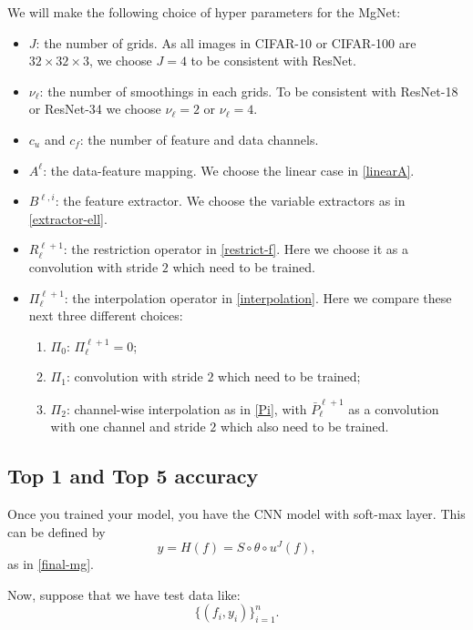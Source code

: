 We will make the following choice of hyper parameters
for the MgNet:
\begin{itemize}
	\item $J$: the number of grids. As all images in CIFAR-10 or CIFAR-100
	are $32\times 32 \times 3$,  we choose $J = 4$ to be consistent with ResNet.
	\item $\nu_\ell$:  the number of smoothings in each grids. To be consistent with
	ResNet-18 or ResNet-34 we choose $\nu_\ell = 2$ or $\nu_\ell = 4$.
	\item $c_u$ and $c_f$: the number of feature and data channels. 
	\item $A^\ell$: the data-feature mapping. We choose the linear case in \eqref{linearA}.
	\item $B^{\ell,i}$: the feature extractor. We choose the variable extractors as in \eqref{extractor-ell}.
	\item $R_{\ell}^{\ell+1}$: the restriction operator in \eqref{restrict-f}. 
	Here we choose it as a convolution with stride $2$ which need to be trained.
	\item $\Pi_\ell^{\ell+1}$: the interpolation operator in
	\eqref{interpolation}.  Here we compare these next three
	different choices: 
	\begin{enumerate}
		\item {$\Pi_0$: } $\Pi_\ell^{\ell+1} = 0$;
		\item {$\Pi_1$: }convolution with stride $2$ which need to be
		trained; 
		\item {$\Pi_2$: }channel-wise interpolation as in
		\eqref{Pi}, with $\bar P_{\ell}^{\ell+1}$ as a convolution
		with one channel and stride $2$ which also need to be trained.
	\end{enumerate}
\end{itemize}

\subsection{Top 1 and Top 5 accuracy}
Once you trained your model, you have the CNN model with soft-max layer.  
This can be defined by
\begin{equation}
y = H(f) = S \circ \theta \circ u^{J}(f),
\end{equation}
as in \eqref{final-mg}.

Now, suppose that we have test data like: 
\begin{equation}
\{(f_i, y_i)\}_{i=1}^n.
\end{equation}

